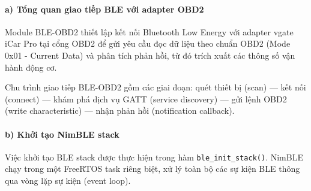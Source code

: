 \documentclass[13pt,a4paper]{extarticle}
\renewcommand{\\}{\thesislongtableorignewline\hline}%
\begin{document}
\paragraph{a) Tổng quan giao tiếp BLE với adapter
OBD2}\label{a-tux1ed5ng-quan-giao-tiux1ebfp-ble-vux1edbi-adapter-obd2}

Module BLE-OBD2 thiết lập kết nối Bluetooth Low Energy với adapter vgate
iCar Pro tại cổng OBD2 để gửi yêu cầu đọc dữ liệu theo chuẩn OBD2 (Mode
0x01 - Current Data) và phân tích phản hồi, từ đó trích xuất các thông
số vận hành động cơ.

Chu trình giao tiếp BLE-OBD2 gồm các giai đoạn: quét thiết bị (scan) ---
kết nối (connect) --- khám phá dịch vụ GATT (service discovery) --- gửi
lệnh OBD2 (write characteristic) --- nhận phản hồi (notification
callback).

\paragraph{b) Khởi tạo NimBLE
stack}\label{b-khux1edfi-tux1ea1o-nimble-stack}

Việc khởi tạo BLE stack được thực hiện trong hàm
\texttt{ble\_init\_stack()}. NimBLE chạy trong một FreeRTOS task riêng
biệt, xử lý toàn bộ các sự kiện BLE thông qua vòng lặp sự kiện (event
loop).
\end{document}

